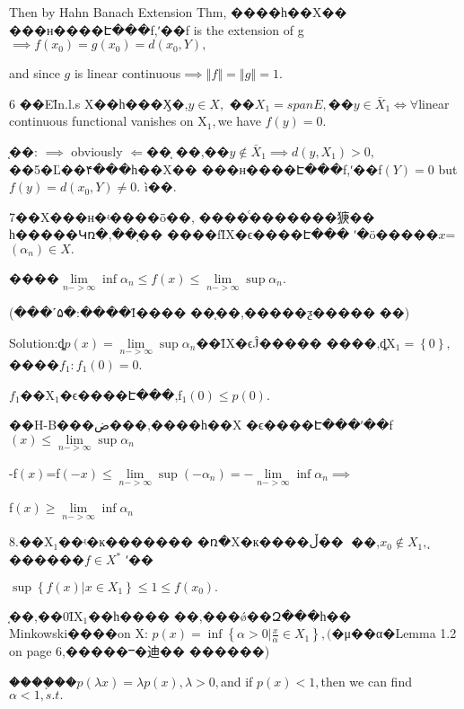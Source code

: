 \documentclass{article}
\begin{document}
\begin{CJK}{GBK}{song}
Then by Hahn Banach Extension Thm, ����һ��X��%
���н����Է���f,ʹ��f
is the extension of g$\implies f\left( x_{0}\right) =g\left( x_{0}\right)
=d\left( x_{0},Y\right) ,$

and since $g$ is linear continuous$\implies \left\Vert f\right\Vert
=\left\Vert g\right\Vert =1.$

6 ��EΪn.l.s X��һ���Ӽ�,$y\in X,$%
��$X_{1}=spanE,$��$y\in \bar{X}_{1}\iff \forall $linear
continuous functional vanishes on X$_{1},$we have $f\left( y\right) =0.$

֤��: $\implies $ obviously $\Longleftarrow $��֤%
��,��$y\notin \bar{X}_{1}\implies d\left( y,X_{1}\right) >0,$%
��5�Ľ��۴���һ��X��%
���н����Է���f,ʹ��f$%
\left( Y\right) =0$ but $f\left( y\right) =d\left( x_{0},Y\right) \neq 0.$%
ì��.

7��X���н�ʵ����ȫ��,%
����ͨ�������㹹��%
һ�����Կռ�,��֤��%
����fΪX�ϵ����Է���%
ʹ�ö�����$x$=$\left( \alpha _{n}\right) \in
X. $

����$\underset{n->\infty }{\lim }\inf \alpha _{n}\leq f\left(
x\right) \leq \underset{n->\infty }{\lim }\sup \alpha _{n}.$

(���˹۵�:����Ϊ����%
��֤��,�����ƺ�����%
��)

Solution:\bigskip ȡ$p\left( x\right) =\underset{n->\infty }{\lim }%
\sup \alpha _{n}$��ΪX�ϵĴ�����%
����,ȡX$_{1}=\left\{ 0\right\} ,$����$%
f_{1}:f_{1}\left( 0\right) =0.$

$f_{1}$��X$_{1}$�ϵ����Է���,f$%
_{1}\left( 0\right) \leq p\left( 0\right) .$

��H-B���ض���,����һ��X%
�ϵ����Է���ʹ��f$\left(
x\right) \leq \underset{n->\infty }{\lim }\sup \alpha _{n}$

-f$\left( x\right) $=f$\left( -x\right) \leq \underset{n->\infty }{\lim }%
\sup \left( -\alpha _{n}\right) =-\underset{n->\infty }{\lim }\inf \alpha
_{n}\implies $

f$\left( x\right) \geq \underset{n->\infty }{\lim }\inf \alpha _{n}$

8.��X$_{1}$��ʵ�ĸ�������%
�ռ�X�к����ڵ��͹%
��,$x_{0}\notin X_{1},$֤������$f\in X^{\ast }$%
ʹ��

$\sup \left\{ f\left( x\right) |x\in X_{1}\right\} \leq 1\leq f\left(
x_{0}\right) .$

֤��,��0ΪX$_{1}$��һ����%
��,���ǿ��Զ���һ��%
Minkowski����on X: $p\left( x\right) =\inf \left\{ \alpha >0|%
\frac{x}{\alpha }\in X_{1}\right\} ,($�μ��α�Lemma
1.2 on page 6,�����ⲻ�迪��%
������)

\bigskip ����֤��$p\left( \lambda x\right) =\lambda
p\left( x\right) ,\lambda >0,$and if $p\left( x\right) <1,$then we can find $%
\alpha <1,s.t.$


\end{CJK}
\end{document}
